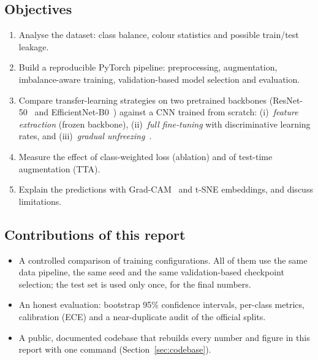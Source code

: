 \subsection{Objectives}
\begin{enumerate}
  \item Analyse the dataset: class balance, colour statistics and possible train/test leakage.
  \item Build a reproducible PyTorch pipeline: preprocessing, augmentation, imbalance-aware training,
        validation-based model selection and evaluation.
  \item Compare transfer-learning strategies on two pretrained backbones (ResNet-50~\cite{resnet} and
        EfficientNet-B0~\cite{efficientnet}) against a CNN trained from scratch:
        (i)~\emph{feature extraction} (frozen backbone), (ii)~\emph{full fine-tuning} with discriminative learning
        rates, and (iii)~\emph{gradual unfreezing}~\cite{ulmfit}.
  \item Measure the effect of class-weighted loss (ablation) and of test-time augmentation (TTA).
  \item Explain the predictions with Grad-CAM~\cite{gradcam} and t-SNE embeddings, and discuss limitations.
\end{enumerate}

\subsection{Contributions of this report}
\begin{itemize}
  \item A controlled comparison of \NumRuns{} training configurations. All of them use the same data pipeline,
        the same seed and the same validation-based checkpoint selection; the test set is used only once, for
        the final numbers.
  \item An honest evaluation: bootstrap 95\% confidence intervals, per-class metrics, calibration (ECE) and a
        near-duplicate audit of the official splits.
  \item A public, documented codebase that rebuilds every number and figure in this report with one command
        (Section~\ref{sec:codebase}).
\end{itemize}
